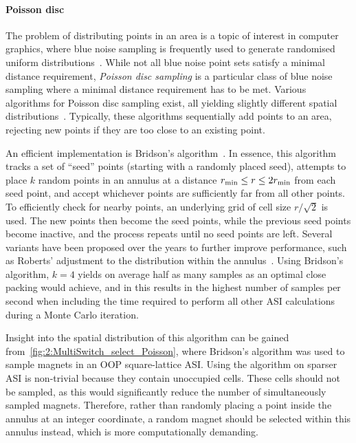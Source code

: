 \paragraph{Poisson disc}
The problem of distributing points in an area is a topic of interest in computer graphics, where blue noise sampling is frequently used to generate randomised uniform distributions~\cite{BlueNoiseSurvey}. %
While not all blue noise point sets satisfy a minimal distance requirement, \textit{Poisson disc sampling} is a particular class of blue noise sampling where a minimal distance requirement has to be met.
Various algorithms for Poisson disc sampling exist, all yielding slightly different spatial distributions~\cite{EfficientBlueNoisePointSets,PoissonDiskComparison,SamplingPolyominoes}.
Typically, these algorithms sequentially add points to an area, rejecting new points if they are too close to an existing point. \par
An efficient implementation is Bridson's algorithm~\cite{FastPoissonDiskSampling}.
In essence, this algorithm tracks a set of ``seed'' points (starting with a randomly placed seed), attempts to place $k$ random points in an annulus at a distance $r_\mathrm{min} \leq r \leq 2 r_\mathrm{min}$ from each seed point, and accept whichever points are sufficiently far from all other points.
To efficiently check for nearby points, an underlying grid of cell size $r/\sqrt{2}$ is used.
The new points then become the seed points, while the previous seed points become inactive, and the process repeats until no seed points are left.
Several variants have been proposed over the years to further improve performance, such as Roberts' adjustment to the distribution within the annulus~\cite{PoissonRoberts}.
Using Bridson's algorithm, $k=4$ yields on average half as many samples as an optimal close packing would achieve, and in \hotspice this results in the highest number of samples per second when including the time required to perform all other ASI calculations during a Monte Carlo iteration. \par
Insight into the spatial distribution of this algorithm can be gained from~\cref{fig:2:MultiSwitch_select_Poisson}, where Bridson's algorithm was used to sample magnets in an OOP square-lattice ASI.
Using the algorithm on sparser ASI is non-trivial because they contain unoccupied cells.
These cells should not be sampled, as this would significantly reduce the number of simultaneously sampled magnets.
Therefore, rather than randomly placing a point inside the annulus at an integer coordinate, a random magnet should be selected within this annulus instead, which is more computationally demanding.

